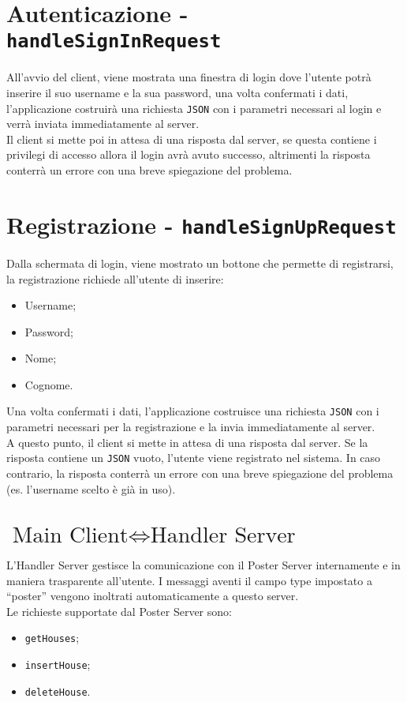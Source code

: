 \section{Autenticazione - \texttt{handleSignInRequest}}
\noindent All’avvio del client, viene mostrata una finestra di login dove l’utente potrà inserire il suo username e la sua password, una volta confermati i dati, l’applicazione costruirà una richiesta \texttt{JSON} con i parametri necessari al login e verrà inviata immediatamente al server.\\Il client si mette poi in attesa di una risposta dal server, se questa contiene i privilegi di accesso allora il login avrà avuto successo, altrimenti la risposta conterrà un errore con una breve spiegazione del problema.

\section{Registrazione - \texttt{handleSignUpRequest}}
\noindent Dalla schermata di login, viene mostrato un bottone che permette di registrarsi, la registrazione richiede all’utente di inserire:
\begin{itemize}
    \item Username;
    \item Password;
    \item Nome;
    \item Cognome.
\end{itemize}
Una volta confermati i dati, l’applicazione costruisce una richiesta \texttt{JSON} con i parametri necessari per la registrazione e la invia immediatamente al server.\\
A questo punto, il client si mette in attesa di una risposta dal server. Se la risposta contiene un \texttt{JSON} vuoto, l’utente viene registrato nel sistema. In caso contrario, la risposta conterrà un errore con una breve spiegazione del problema (es. l’username scelto è già in uso).

\section{$\text{Main Client} \Leftrightarrow \text{Handler Server}$}
\noindent L’Handler Server gestisce la comunicazione con il Poster Server internamente e in maniera trasparente all’utente. I messaggi aventi il campo type impostato a “poster” vengono inoltrati automaticamente a questo server.\\
Le richieste supportate dal Poster Server sono:
\begin{itemize}
    \item \texttt{getHouses};
    \item \texttt{insertHouse};
    \item \texttt{deleteHouse}.
\end{itemize}

